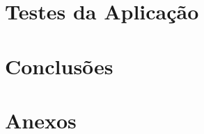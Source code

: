 \documentclass{article}
\begin{document}





\pagebreak

\section{Testes da Aplicação}




\pagebreak

\section{Conclusões}


\pagebreak

\section{Anexos}
\end{document}
